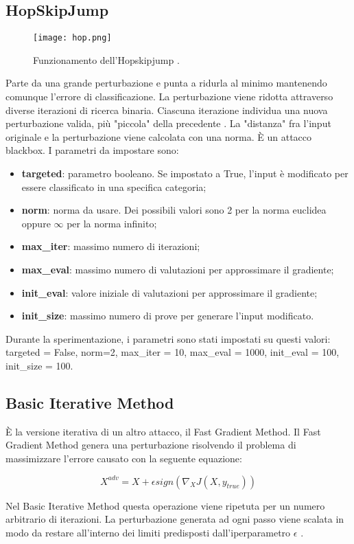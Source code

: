 \subsection{HopSkipJump}
\begin{figure}[h]
    \texttt{[image: hop.png]}
    \caption{Funzionamento dell'Hopskipjump \cite{hopskip}.}
    \label{fig:hop}
\end{figure}
Parte da una grande perturbazione e punta a ridurla al minimo mantenendo comunque l'errore di classificazione.
La perturbazione viene ridotta attraverso diverse iterazioni di ricerca binaria. Ciascuna iterazione individua una nuova perturbazione valida, più "piccola" della precedente \cite{hopskip}.
La "distanza" fra l'input originale e la perturbazione viene calcolata con una norma.
È un attacco blackbox. I parametri da impostare sono: \begin{itemize}
    \item \textbf{targeted}: parametro booleano. Se impostato a True, l'input è modificato  per essere classificato in una specifica categoria;
    \item \textbf{norm}: norma da usare. Dei possibili valori sono 2 per la norma euclidea oppure $\infty$ per la norma infinito;
    \item \textbf{max\_iter}: massimo numero di iterazioni;
    \item \textbf{max\_eval}: massimo numero di valutazioni per approssimare il gradiente;
    \item \textbf{init\_eval}: valore iniziale di valutazioni per approssimare il gradiente;
    \item \textbf{init\_size}: massimo numero di prove per generare l'input modificato.
\end{itemize}
Durante la sperimentazione, i parametri sono stati impostati su questi valori: targeted = False, norm=2, max\_iter = 10, max\_eval = 1000, init\_eval = 100, init\_size = 100.
\subsection{Basic Iterative Method}
È la versione iterativa di un altro attacco, il Fast Gradient Method. Il Fast Gradient Method genera una perturbazione risolvendo il problema di massimizzare l'errore causato con la seguente equazione:

\[X^{adv} = X + \epsilon sign(\nabla _{X}J(X,y_{true}))\]

Nel Basic Iterative Method  questa operazione viene ripetuta per un numero arbitrario di iterazioni.  La perturbazione generata ad ogni passo viene scalata in modo da restare
all'interno dei limiti predisposti dall'iperparametro $\epsilon$ \cite{bim}.

